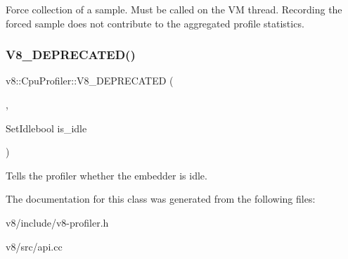 Force collection of a sample. Must be called on the VM thread. Recording the forced sample does not contribute to the aggregated profile statistics. \mbox{\label{classv8_1_1CpuProfiler_aa5a41d80d7d262f2c171a4382f2fbd4f}} 
\subsubsection{\texorpdfstring{V8\+\_\+\+D\+E\+P\+R\+E\+C\+A\+T\+E\+D()}{V8\_DEPRECATED()}\hspace{0.1cm}{\footnotesize\ttfamily [2/2]}}
{\footnotesize\ttfamily v8\+::\+Cpu\+Profiler\+::\+V8\+\_\+\+D\+E\+P\+R\+E\+C\+A\+T\+ED (\begin{DoxyParamCaption}\item[{\char`\"{}Use Isolate\+::\+Set\+Idle(\mbox{\hyperlink{classbool}{bool}}) instead.\char`\"{}}]{,  }\item[{void }]{Set\+Idlebool is\+\_\+idle }\end{DoxyParamCaption})}

Tells the profiler whether the embedder is idle. 

The documentation for this class was generated from the following files\+:\begin{DoxyCompactItemize}
\item 
v8/include/v8-\/profiler.\+h\item 
v8/src/api.\+cc\end{DoxyCompactItemize}
